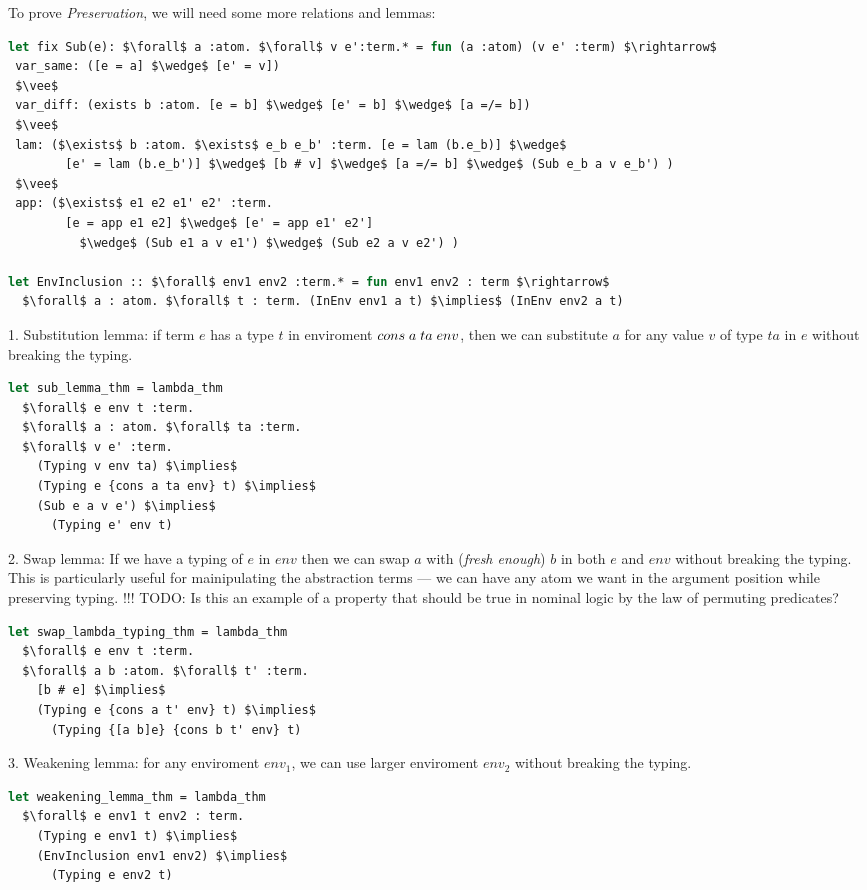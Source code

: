 \documentclass[english, mgr]{iithesis}
\renewcommand{\it}[1]{\textit{#1}}
\begin{document}
To prove \it{Preservation}, we will need some more relations and lemmas:
\begin{lstlisting}[mathescape, language=OCaml]
let fix Sub(e): $\forall$ a :atom. $\forall$ v e':term.* = fun (a :atom) (v e' :term) $\rightarrow$
 var_same: ([e = a] $\wedge$ [e' = v])
 $\vee$
 var_diff: (exists b :atom. [e = b] $\wedge$ [e' = b] $\wedge$ [a =/= b])
 $\vee$
 lam: ($\exists$ b :atom. $\exists$ e_b e_b' :term. [e = lam (b.e_b)] $\wedge$
        [e' = lam (b.e_b')] $\wedge$ [b # v] $\wedge$ [a =/= b] $\wedge$ (Sub e_b a v e_b') )
 $\vee$
 app: ($\exists$ e1 e2 e1' e2' :term.
        [e = app e1 e2] $\wedge$ [e' = app e1' e2']
          $\wedge$ (Sub e1 a v e1') $\wedge$ (Sub e2 a v e2') )

let EnvInclusion :: $\forall$ env1 env2 :term.* = fun env1 env2 : term $\rightarrow$
  $\forall$ a : atom. $\forall$ t : term. (InEnv env1 a t) $\implies$ (InEnv env2 a t)
\end{lstlisting}

1. Substitution lemma:
if term $e$ has a type $t$ in enviroment ${cons}\;a\;ta\;env$,
then we can substitute $a$ for any value $v$ of type $ta$ in $e$ without breaking the typing.
\begin{lstlisting}[mathescape,language=OCaml]
let sub_lemma_thm = lambda_thm
  $\forall$ e env t :term.
  $\forall$ a : atom. $\forall$ ta :term.
  $\forall$ v e' :term.
    (Typing v env ta) $\implies$
    (Typing e {cons a ta env} t) $\implies$
    (Sub e a v e') $\implies$
      (Typing e' env t)
\end{lstlisting}

2. Swap lemma:
If we have a typing of $e$ in $env$ then we can
swap $a$ with (\it{fresh enough}) $b$ in both $e$ and $env$ without breaking the typing.
This is particularly useful for mainipulating the abstraction terms ---
we can have any atom we want in the argument position while preserving typing.
!!! TODO: Is this an example of a property that should be true in nominal logic
by the law of permuting predicates?
\begin{lstlisting}[mathescape,language=OCaml]
let swap_lambda_typing_thm = lambda_thm
  $\forall$ e env t :term.
  $\forall$ a b :atom. $\forall$ t' :term.
    [b # e] $\implies$
    (Typing e {cons a t' env} t) $\implies$
      (Typing {[a b]e} {cons b t' env} t)
\end{lstlisting}

3. Weakening lemma: for any enviroment $env_1$, we can use larger enviroment $env_2$ without breaking the typing.
\begin{lstlisting}[mathescape,language=OCaml]
let weakening_lemma_thm = lambda_thm
  $\forall$ e env1 t env2 : term.
    (Typing e env1 t) $\implies$
    (EnvInclusion env1 env2) $\implies$
      (Typing e env2 t)
\end{lstlisting}
\end{document}
